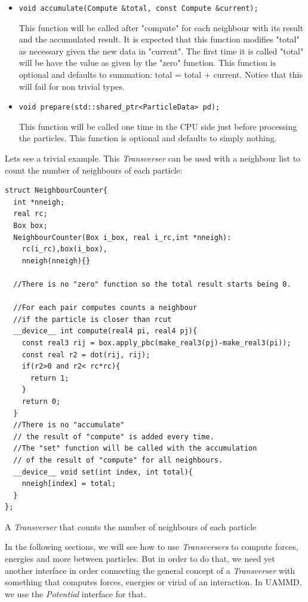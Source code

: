 \documentclass[ twoside,openright,titlepage,numbers=noenddot,%
headinclude,footinclude,cleardoublepage=empty,abstract=on,
BCOR=5mm,paper=a4,fontsize=11pt, dvipsnames
]{scrreprt}
\newcommand{\uammd}{\gls{UAMMD}\xspace}
\begin{document}
\begin{itemize}
 \item \texttt{void accumulate(Compute &total, const Compute &current);}

   
  This function will be called after "compute" for each neighbour with its result and the accumulated result.
  It is expected that this function modifies "total" as necessary given the new data in "current".
  The first time it is called "total" will be have the value as given by the "zero" function.
  This function is optional and defaults to summation: total = total + current. Notice that this will fail for non trivial types.
     
\item \texttt{void prepare(std::shared_ptr<ParticleData> pd);}

  
  This function will be called one time in the CPU side just before processing the particles.
  This function is optional and defaults to simply nothing.
 \end{itemize}

Lets see a trivial example.
This \emph{Transverser} can be used with a neighbour list to count the number of neighbours of each particle:
\begin{listing}
\begin{verbatim}
struct NeighbourCounter{
  int *nneigh;
  real rc;
  Box box;
  NeighbourCounter(Box i_box, real i_rc,int *nneigh):
    rc(i_rc),box(i_box),
    nneigh(nneigh){}

  //There is no "zero" function so the total result starts being 0.
  
  //For each pair computes counts a neighbour 
  //if the particle is closer than rcut
  __device__ int compute(real4 pi, real4 pj){
    const real3 rij = box.apply_pbc(make_real3(pj)-make_real3(pi));
    const real r2 = dot(rij, rij);
    if(r2>0 and r2< rc*rc){
      return 1;
    }
    return 0;
  }
  //There is no "accumulate"
  // the result of "compute" is added every time.
  //The "set" function will be called with the accumulation
  // of the result of "compute" for all neighbours. 
  __device__ void set(int index, int total){
    nneigh[index] = total;
  }
};
\end{verbatim}
\caption{A \emph{Transverser} that counts the number of neighbours of each particle}
\label{code:ncounter}
\end{listing}
In the following sections, we will see how to use \emph{Transversers} to compute forces, energies and more between particles.
But in order to do that, we need yet another interface in order connecting the general concept of a \emph{Transverser} with something that computes forces, energies or virial of an interaction. In \uammd, we use the \emph{Potential} interface for that.
\end{document}
